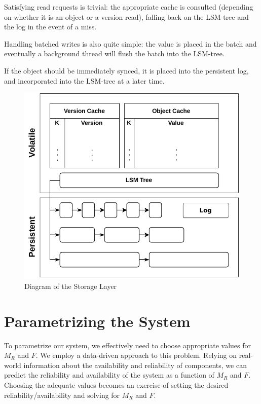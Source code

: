 Satisfying read requests is trivial: the appropriate cache is
consulted (depending on whether it is an object or a version
read), falling back on the \ac{LSM-tree} and the log in the event of a miss.

Handling batched writes is also quite simple: the
value is placed in the batch and eventually a background thread
will flush the batch into the \ac{LSM-tree}.

If the object should be immediately synced, it is placed into the
persistent log, and incorporated into the \ac{LSM-tree} at a later
time.

\begin{figure}[t]
    \centering
    \includegraphics[width=.75\linewidth]{img/storage_layer}
    \caption{Diagram of the Storage Layer}\label{fig:storage_layer}
\end{figure}


\section{Parametrizing the System}\label{sec:r2s2parametrization}

To parametrize our system, we effectively need to choose
appropriate values for $M_R$ and $F$. We employ a data-driven
approach to this problem. Relying on real-world information about
the availability and reliability of components, we can predict
the reliability and availability of the system as a function of
$M_R$ and $F$. Choosing the adequate values becomes an exercise of
setting the desired reliability/availability and solving for $M_R$
and $F$.

